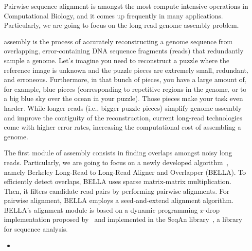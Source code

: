 \justify
Pairwise sequence alignment is amongst the most compute intensive operations in Computational Biology, and it comes up frequently in many applications. 
Particularly, we are going to focus on the \denovo long-read genome assembly problem.

\Denovo assembly is the process of accurately reconstructing a genome sequence from overlapping, error-containing DNA sequence fragments (reads) that redundantly sample a genome. 
Let's imagine you need to reconstruct a puzzle where the reference image is unknown and the puzzle pieces are extremely small, redundant, and erroneous. 
Furthermore, in that bunch of pieces, you have a large amount of, for example, blue pieces (corresponding to repetitive regions in the genome, or to a big blue sky over the ocean in your puzzle).
Those pieces make your task even harder. While longer reads (i.e., bigger puzzle pieces) simplify genome assembly and improve the contiguity of the reconstruction, current long-read technologies come with higher error rates, increasing the computational cost of assembling a genome.

The first module of \denovo assembly consists in finding overlaps amongst noisy long reads.
Particularly, we are going to focus on a newly developed algorithm~\citep{guidi2018bella}, namely Berkeley Long-Read to Long-Read Aligner and Overlapper (BELLA).
To efficiently detect overlaps, BELLA uses sparse matrix-matrix multiplication. 
Then, it filters candidate read pairs by performing pairwise alignments.
For pairwise alignment, BELLA employs a seed-and-extend alignment algorithm. BELLA's alignment module is based on a dynamic programming $x$-drop implementation proposed by~\citet{zhang2000greedy} and implemented in the SeqAn library~\citep{doring2008seqan}, a \CC library for sequence analysis. 

\begin{itemize}
	\item {}
\end{itemize}

